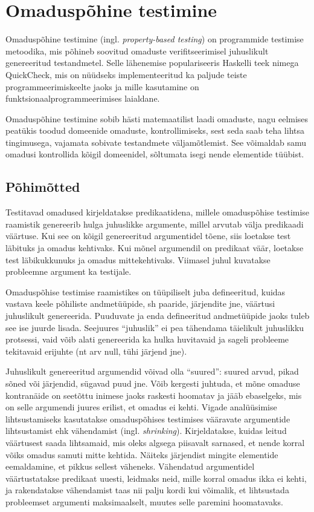 \documentclass[../thesis.tex]{subfiles}
\begin{document}
\section{Omaduspõhine testimine}
Omaduspõhine testimine (ingl. \textit{property-based testing}) on programmide testimise metoodika, mis põhineb soovitud omaduste verifitseerimisel juhuslikult genereeritud testandmetel. Selle lähenemise populariseeris Haskelli teek nimega QuickCheck, mis on nüüdseks implementeeritud ka paljude teiste programmeerimiskeelte jaoks ja mille kasutamine on funktsionaalprogrammeerimises laialdane.

Omaduspõhine testimine sobib hästi matemaatilist laadi omaduste, nagu eelmises peatükis toodud domeenide omaduste, kontrollimiseks, sest seda saab teha lihtsa tingimusega, vajamata sobivate testandmete väljamõtlemist. See võimaldab samu omadusi kontrollida kõigil domeenidel, sõltumata isegi nende elementide tüübist.

\subsection{Põhimõtted}
Testitavad omadused kirjeldatakse predikaatidena, millele omaduspõhise testimise raamistik genereerib hulga juhuslikke argumente, millel arvutab välja predikaadi väärtuse. Kui see on kõigil genereeritud argumentidel tõene, siis loetakse test läbituks ja omadus kehtivaks. Kui mõnel argumendil on predikaat väär, loetakse test läbikukkunuks ja omadus mittekehtivaks. Viimasel juhul kuvatakse probleemne argument ka testijale.

Omaduspõhise testimise raamistikes on tüüpiliselt juba defineeritud, kuidas vastava keele põhiliste andmetüüpide, sh paaride, järjendite jne, väärtusi juhuslikult genereerida. Puuduvate ja enda defineeritud andmetüüpide jaoks tuleb see ise juurde lisada. Seejuures \enquote{juhuslik} ei pea tähendama täielikult juhuslikku protsessi, vaid võib alati genereerida ka hulka huvitavaid ja sageli probleeme tekitavaid erijuhte (nt arv null, tühi järjend jne).

Juhuslikult genereeritud argumendid võivad olla \enquote{suured}: suured arvud, pikad sõned või järjendid, sügavad puud jne. Võib kergesti juhtuda, et mõne omaduse kontranäide on seetõttu inimese jaoks raskesti hoomatav ja jääb ebaselgeks, mis on selle argumendi juures erilist, et omadus ei kehti. Vigade analüüsimise lihtsustamiseks kasutatakse omaduspõhises testimises vääravate argumentide lihtsustamist ehk vähendamist (ingl. \textit{shrinking}). Kirjeldatakse, kuidas leitud väärtusest saada lihtsamaid, mis oleks algsega piisavalt sarnased, et nende korral võiks omadus samuti mitte kehtida. Näiteks järjendist mingite elementide eemaldamine, et pikkus sellest väheneks. Vähendatud argumentidel väärtustatakse predikaat uuesti, leidmaks neid, mille korral omadus ikka ei kehti, ja rakendatakse vähendamist taas nii palju kordi kui võimalik, et lihtsustada probleemset argumenti maksimaalselt, muutes selle paremini hoomatavaks.
\end{document}
